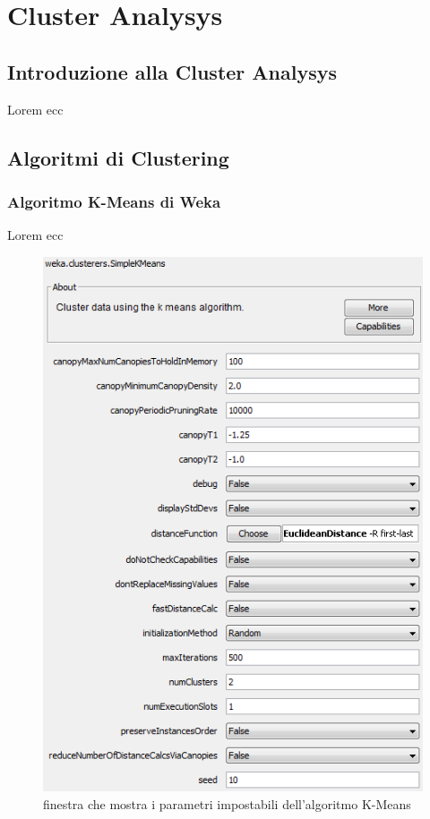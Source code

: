 \chapter{Cluster Analysys}
\label{ch:cluster}

\section{Introduzione alla Cluster Analysys}

    Lorem ecc

\section{Algoritmi di Clustering}

    \subsection{Algoritmo K-Means di Weka}
        Lorem ecc

        \begin{figure}
            \centering
            \caption{finestra che mostra i parametri impostabili dell'algoritmo K-Means}
            \label{kmeans_weka}
            \includegraphics[scale=0.50]{img/cluster_k_means.png}
        \end{figure}

